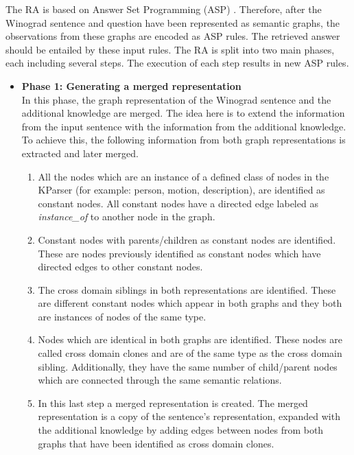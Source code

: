 The RA is based on Answer Set Programming (ASP) \cite{DBLP:conf/aaai/Lifschitz08}. Therefore, after the Winograd sentence and question have been represented as semantic graphs, the observations from these graphs are encoded as ASP rules. The retrieved answer should be entailed by these input rules.
The RA is split into two main phases, each including several steps. The execution of each step results in new ASP rules. 
\begin{itemize}
	\item \textbf{Phase 1: Generating a merged representation}\\
	 In this phase, the graph representation of the Winograd sentence and the additional knowledge are merged. The idea here is to extend the information from the input sentence with the information from the additional knowledge. To achieve this, the following information from both graph representations is extracted and later merged.
	\begin{enumerate}
		\item All the nodes which are an instance of a defined class of nodes in the KParser (for example: person, motion, description), are identified as constant nodes. All constant nodes have a directed edge labeled as \textit{instance\_of} to another node in the graph. 
		\item Constant nodes with parents/children as constant nodes are identified. These are nodes previously identified as constant nodes which have directed edges to other constant nodes.
		\item The cross domain siblings in both representations are identified. These are different constant nodes which appear in both graphs and they both are instances of nodes of the same type. 
		\item Nodes which are identical in both graphs are identified. These nodes are called cross domain clones and are of the same type as the cross domain sibling. Additionally, they have the same number of child/parent nodes which are connected through the same semantic relations. 
		\item In this last step a merged representation is created. The merged representation is a copy of the sentence's representation, expanded with the additional knowledge by adding edges between nodes from both graphs that have been identified as cross domain clones.
	\end{enumerate}


\end{itemize}

